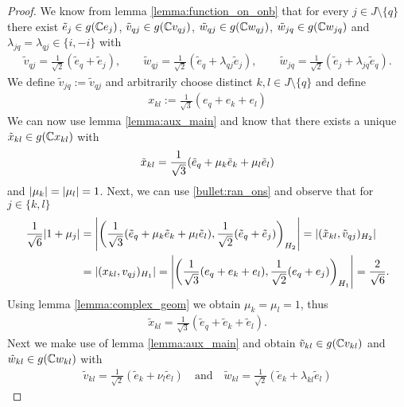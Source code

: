 \begin{proof}
	We know from lemma \ref{lemma:function_on_onb} that for every $j \in J \setminus \{q\}$ there exist $\tilde{e}_j \in g(\mathbb{C} e_j)$, $\tilde{v}_{qj} \in g(\mathbb{C} v_{qj})$, $\tilde{w}_{qj} \in g(\mathbb{C} w_{qj})$, $\tilde{w}_{jq} \in g(\mathbb{C} w_{jq})$ and $\lambda_{jq} = \lambda_{qj} \in \{i, -i\}$ with
	\begin{align*}
	\tilde{v}_{qj} = \frac{1}{\sqrt{2}}(\tilde{e}_q + \tilde{e}_j), \qquad \tilde{w}_{qj} = \frac{1}{\sqrt{2}}(\tilde{e}_q + \lambda_{qj}\tilde{e}_j), \qquad \tilde{w}_{jq} = \frac{1}{\sqrt{2}}(\tilde{e}_j + \lambda_{jq} \tilde{e}_q).
	\end{align*} 
	We define $\tilde{v}_{jq} := \tilde{v}_{qj}$ and arbitrarily choose distinct $k,l \in J \setminus \{q\}$ and define
	\begin{align*}
	x_{kl} := \frac{1}{\sqrt{3}}(e_q + e_k + e_l) 
	\end{align*} 
	We can now use lemma \ref{lemma:aux_main} and know that there exists a unique $\tilde{x}_{kl} \in g(\mathbb{C} x_{kl})$ with 
	\begin{align*}
	\tilde{x}_{kl} = \frac{1}{\sqrt{3}} {\left ( \tilde{e}_q + \mu_{k} \tilde{e}_k + \mu_{l} \tilde{e}_l \right )} 
	\end{align*}
	and ${\left | \mu_k \right |} = {\left | \mu_l \right |} = 1$. Next, we can use \ref{bullet:ran_ons} and observe that for $j \in \{k,l\}$
	\begin{align*}
	\frac{1}{\sqrt{6}} {\left | 1 + \mu_j \right |} &= {\left | {\left ( \frac{1}{\sqrt{3}} {\left ( \tilde{e}_q + \mu_k \tilde{e}_k + \mu_l \tilde{e}_l \right )}, \frac{1}{\sqrt{2}} {\left ( \tilde{e}_q + \tilde{e}_j \right )} \right )}_{H_2} \right |} = |(\tilde{x}_{kl}, \tilde{v}_{qj})_{H_2}| \\
	&= |(x_{kl}, v_{qj})_{H_1}| = {\left | {\left ( \frac{1}{\sqrt{3}} {\left ( e_q + e_k + e_l \right )}, \frac{1}{\sqrt{2}} (e_q + e_j) \right )}_{H_1} \right |} = \frac{2}{\sqrt{6}}.
	\end{align*}
	Using lemma \ref{lemma:complex_geom} we obtain $\mu_k = \mu_l = 1$, thus
	\begin{align*}
	\tilde{x}_{kl} = \frac{1}{\sqrt{3}}(\tilde{e}_q + \tilde{e}_k + \tilde{e}_l).
	\end{align*}
	Next we make use of lemma \ref{lemma:aux_main} and obtain $\tilde{v}_{kl} \in g(\mathbb{C} v_{kl})$ and $\tilde{w}_{kl} \in g(\mathbb{C} w_{kl})$ with
	\begin{align*}
	\tilde{v}_{kl} = \frac{1}{\sqrt{2}}(\tilde{e}_k + \nu_l \tilde{e}_l) \quad \text{and} \quad \tilde{w}_{kl} = \frac{1}{\sqrt{2}}(\tilde{e}_k + \lambda_{kl} \tilde{e}_l)
	\end{align*}

\end{proof}
